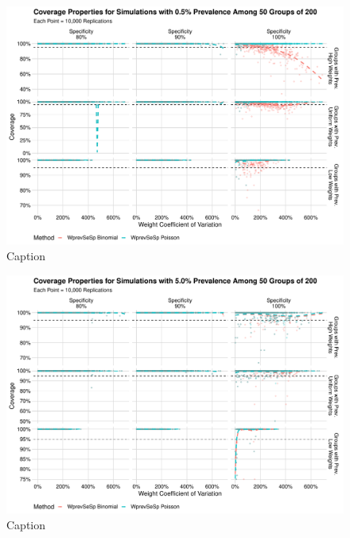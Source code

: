 \documentclass[AMA,STIX1COL]{WileyNJD-v2}
\begin{document}
\begin{figure}
    \centering
    \includegraphics[width=\textwidth]{figures/imperfect_coverage_50_0_005_reduced.pdf}
    \caption{Caption}
    \label{fig:imperfect_coverage_50_0_005_reduced}
\end{figure}


\begin{figure}
    \centering
    \includegraphics[width=\textwidth]{figures/imperfect_coverage_50_0_05_reduced.pdf}
    \caption{Caption}
    \label{fig:imperfect_coverage_50_0_05_reduced}
\end{figure}
\end{document}
